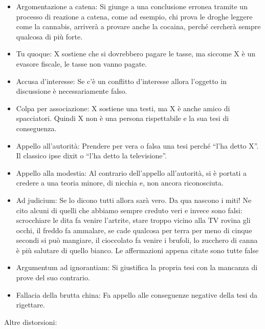 \documentclass[12pt]{book} %
\begin{document}
\begin{itemize}
\item Argomentazione a catena: Si giunge a una conclusione erronea tramite un processo di reazione a catena, come ad
esempio, chi prova le droghe leggere come la cannabis, arriverà a provare anche la cocaina, perché cercherà sempre
qualcosa di più forte.
\item Tu quoque: X sostiene che si dovrebbero pagare le tasse, ma siccome X è un evasore fiscale, le tasse non vanno
pagate.
\item Accusa d'interesse: Se c'è un conflitto d'interesse allora
l'oggetto in discussione è necessariamente falso.
\item Colpa per associazione: X sostiene una testi, ma X è anche amico di spacciatori. Quindi X non è una persona
rispettabile e la sua tesi di conseguenza.
\item Appello all'autorità: Prendere per vera o falsa una tesi perché “l'ha detto X”. Il classico
ipse dixit o “l'ha detto la televisione”.
\item Appello alla modestia: Al contrario dell'appello all'autorità, si è portati a credere a una teoria minore, di
nicchia e, non ancora riconosciuta.
\item Ad judicium: Se lo dicono tutti allora sarà vero. Da qua nascono i miti! Ne cito alcuni di quelli che abbiamo
sempre creduto veri e invece sono falsi: scrocchiare le dita fa venire l'artrite, stare troppo vicino alla TV rovina
gli occhi, il freddo fa ammalare, se cade qualcosa per terra per meno di cinque secondi si può mangiare, il cioccolato
fa venire i brufoli, lo zucchero di canna è più salutare di quello bianco. Le affermazioni appena citate sono tutte
false
\item Argumentum ad ignorantiam: Si giustifica la propria tesi con la mancanza di prove del suo contrario.
\item Fallacia della brutta china: Fa appello alle conseguenze negative della tesi da rigettare.
\end{itemize}

\bigskip

Altre distorsioni:
\end{document}
